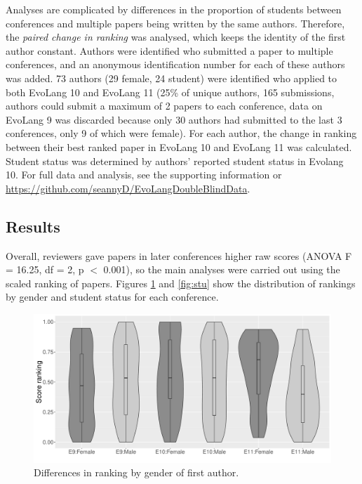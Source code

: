 \documentclass[12pt]{article}
\begin{document}
Analyses are complicated by differences in the proportion of students between conferences and multiple papers being written by the same authors.  Therefore, the \emph{paired change in ranking} was analysed, which keeps the identity of the first author constant.  Authors were identified who submitted a paper to multiple conferences, and an anonymous identification number for each of these authors was added.  73 authors (29 female, 24 student) were identified who applied to both EvoLang 10 and EvoLang 11 (25\% of unique authors, 165 submissions, authors could submit a maximum of 2 papers to each conference, data on EvoLang 9 was discarded because only 30 authors had submitted to the last 3 conferences, only 9 of which were female).  For each author, the change in ranking between their best ranked paper in EvoLang 10 and EvoLang 11 was calculated. Student status was determined by authors' reported student status in Evolang 10.  For full data and analysis, see the supporting information or \url{https://github.com/seannyD/EvoLangDoubleBlindData}.

\subsection{Results}

Overall, reviewers gave papers in later conferences higher raw scores (ANOVA F = 16.25, df = 2, p $<$ 0.001), so the main analyses were carried out using the scaled ranking of papers.  Figures \ref{fig:gen} and \ref{fig:stu} show the distribution of rankings by gender and student status for each conference.  

\begin{figure}[htbp]
\begin{center}
\includegraphics[width=130mm]{../Results_Gender_3conf.pdf}

\caption{Differences in ranking by gender of first author.}
\label{fig:gen}
\end{center}
\end{figure}
\end{document}
